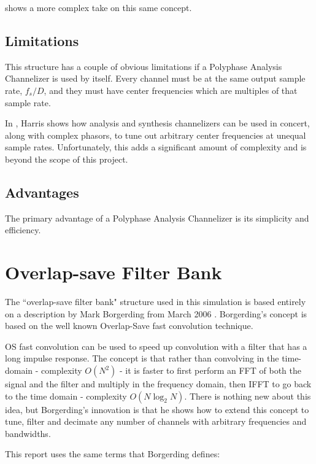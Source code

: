 \documentclass[12pt]{report}
\begin{document}
\cite{Harris2} shows a more complex take on this same concept.


\subsection{Limitations}
\label{sec:poly_limitations}
This structure has a couple of obvious limitations if a Polyphase Analysis
Channelizer is used by itself. Every channel must be at the same output sample
rate, $f_s/D$, and they must have center frequencies which are multiples of
that sample rate.

In \cite{Harris2}, Harris shows how analysis and synthesis
channelizers can be used in concert, along with complex phasors, to tune out
arbitrary center frequencies at unequal sample rates. Unfortunately, this adds
a significant amount of complexity and is beyond the scope of this project.

\subsection{Advantages}
\label{sec:poly_advantages}
The primary advantage of a Polyphase Analysis Channelizer is its simplicity and efficiency.

\section{Overlap-save Filter Bank}
\label{sec:filter_bank}
The ``overlap-save filter bank" structure used in this simulation is based
entirely on a description by Mark Borgerding from March 2006
\cite{Borgerding1}.  Borgerding's concept is based on the well known
Overlap-Save fast convolution technique.

OS fast convolution can be used to speed up convolution with
a filter that has a long impulse response. The concept is that rather than
convolving in the time-domain - complexity $O(N^2)$ - it is faster to first
perform an FFT of both the signal and the filter and multiply in the frequency
domain, then IFFT to go back to the time domain - complexity $O(N\log_2N)$.
There is nothing new about this idea, but Borgerding's innovation is that he
shows how to extend this concept to tune, filter and decimate any number of
channels with arbitrary frequencies and bandwidths.

This report uses the same terms that Borgerding defines:
\end{document}

